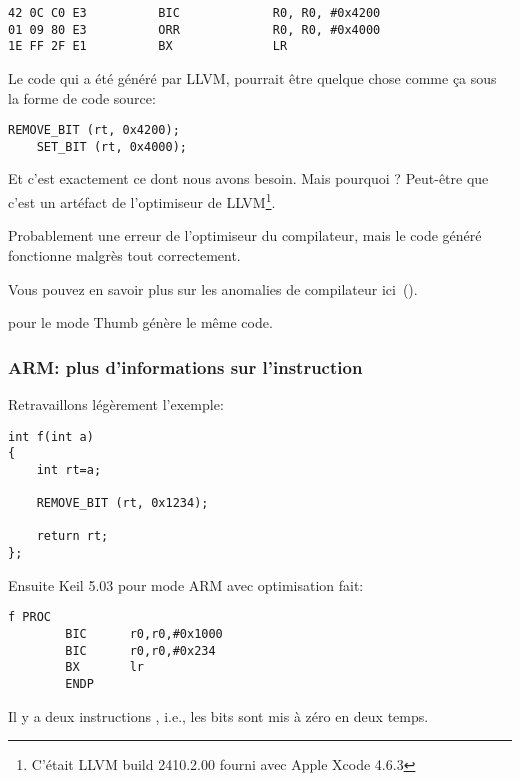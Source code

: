 \begin{lstlisting}[caption=\OptimizingXcodeIV (\ARMMode),label=ARM_leaf_example3,style=customasmARM]
42 0C C0 E3          BIC             R0, R0, #0x4200
01 09 80 E3          ORR             R0, R0, #0x4000
1E FF 2F E1          BX              LR
\end{lstlisting}

Le code qui a été généré par LLVM, pourrait être quelque chose  comme ça sous la
forme de code source:

\begin{lstlisting}[style=customc]
    REMOVE_BIT (rt, 0x4200);
    SET_BIT (rt, 0x4000);
\end{lstlisting}

Et c'est exactement ce dont nous avons besoin.
Mais pourquoi ?
Peut-être que c'est un artéfact de l'optimiseur de LLVM\footnote{C'était LLVM build
2410.2.00 fourni avec Apple Xcode 4.6.3}.

Probablement une erreur de l'optimiseur du compilateur, mais le code généré fonctionne
malgrès tout correctement.

Vous pouvez en savoir plus sur les anomalies de compilateur ici~().

\OptimizingXcodeIV pour le mode Thumb génère le même code.

\subsubsection{ARM: plus d'informations sur l'instruction }

Retravaillons légèrement l'exemple:

\begin{lstlisting}[style=customc]
int f(int a)
{
    int rt=a;

    REMOVE_BIT (rt, 0x1234);

    return rt;
};
\end{lstlisting}

Ensuite Keil 5.03 pour mode ARM avec optimisation fait:

\begin{lstlisting}[style=customasmARM]
f PROC
        BIC      r0,r0,#0x1000
        BIC      r0,r0,#0x234
        BX       lr
        ENDP
\end{lstlisting}

Il y a deux instructions , i.e., les bits  sont mis à zéro en
deux temps.

